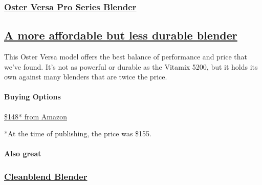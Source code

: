 \href{https://www.nytimes3xbfgragh.onion/wirecutter/out/link/3754/162049/4/109195?merchant=Amazon}{}

\hypertarget{oster-versa-pro-series-blender-1}{%
\subsubsection{\texorpdfstring{\href{https://www.nytimes3xbfgragh.onion/wirecutter/out/link/3754/162049/4/109195?merchant=Amazon}{Oster
Versa Pro Series
Blender}}{Oster Versa Pro Series Blender}}\label{oster-versa-pro-series-blender-1}}

\hypertarget{a-more-affordable-but-less-durable-blender-1}{%
\subsection{\texorpdfstring{\href{https://www.nytimes3xbfgragh.onion/wirecutter/out/link/3754/162049/4/109195?merchant=Amazon}{A
more affordable but less durable
blender}}{A more affordable but less durable blender}}\label{a-more-affordable-but-less-durable-blender-1}}

This Oster Versa model offers the best balance of performance and price
that we've found. It's not as powerful or durable as the Vitamix 5200,
but it holds its own against many blenders that are twice the price.

\hypertarget{buying-options-5}{%
\paragraph{Buying Options}\label{buying-options-5}}

\href{https://www.nytimes3xbfgragh.onion/wirecutter/out/link/3754/162049/4/109195?merchant=Amazon}{\$148*
from Amazon}

*At the time of publishing, the price was \$155.

\hypertarget{also-great-1}{%
\paragraph{Also great}\label{also-great-1}}

\href{https://www.nytimes3xbfgragh.onion/wirecutter/out/link/8947/25620/4/109196?merchant=Amazon}{}

\hypertarget{cleanblend-blender-1}{%
\subsubsection{\texorpdfstring{\href{https://www.nytimes3xbfgragh.onion/wirecutter/out/link/8947/25620/4/109196?merchant=Amazon}{Cleanblend
Blender}}{Cleanblend Blender}}\label{cleanblend-blender-1}}


